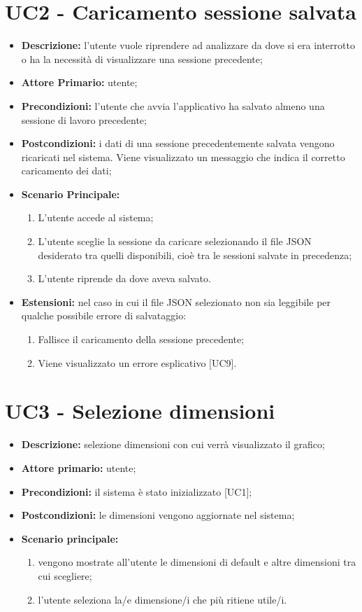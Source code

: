 \section{UC2 - Caricamento sessione salvata}
\begin{itemize}
  \item \textbf{Descrizione:} l'utente vuole riprendere ad analizzare da dove si era interrotto
  o ha la necessità di visualizzare una sessione precedente;
  \item \textbf{Attore Primario:} utente;
  \item \textbf{Precondizioni:} l'utente che avvia l'applicativo ha salvato almeno una sessione di lavoro precedente;
  \item \textbf{Postcondizioni:} i dati di una sessione precedentemente salvata vengono ricaricati nel sistema. Viene visualizzato un messaggio che indica il corretto caricamento dei dati;
  \item \textbf{Scenario Principale:}
  \begin{enumerate}
    \item L'utente accede al sistema;
    \item L'utente sceglie la sessione da caricare selezionando il file JSON desiderato tra quelli disponibili,
    cioè tra le sessioni salvate in precedenza;
    \item L'utente riprende da dove aveva salvato.
  \end{enumerate}
  \item \textbf{Estensioni:} nel caso in cui il file JSON selezionato non sia leggibile per qualche possibile errore di salvataggio:
    \begin{enumerate}
      \item Fallisce il caricamento della sessione precedente;
      \item Viene visualizzato un errore esplicativo [UC9].
    \end{enumerate}
\end{itemize}


\section{UC3 - Selezione dimensioni}
 \begin{itemize}
     \item \textbf{Descrizione:} selezione dimensioni con cui verrà visualizzato il grafico;
     \item \textbf{Attore primario:} utente;
     \item \textbf{Precondizioni:} il sistema è stato inizializzato [UC1];
     \item \textbf{Postcondizioni:} le dimensioni vengono aggiornate nel sistema;
     \item \textbf{Scenario principale:}
     \begin{enumerate}
         \item vengono mostrate all'utente le dimensioni di default e altre dimensioni tra cui scegliere;
         \item l'utente seleziona la/e dimensione/i che più ritiene utile/i.
     \end{enumerate}
 \end{itemize}


